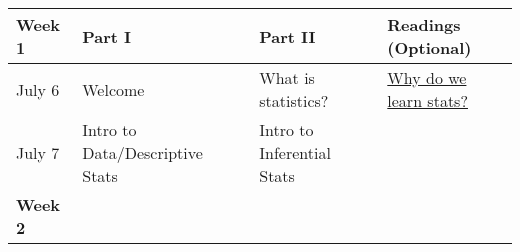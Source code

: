 \documentclass[
]{book}
\begin{document}
\begin{longtable}[]{@{}llll@{}}
\toprule
\begin{minipage}[b]{0.09\columnwidth}\raggedright
\textbf{Week 1}\strut
\end{minipage} & \begin{minipage}[b]{0.32\columnwidth}\raggedright
\textbf{Part I}\strut
\end{minipage} & \begin{minipage}[b]{0.29\columnwidth}\raggedright
\textbf{Part II}\strut
\end{minipage} & \begin{minipage}[b]{0.18\columnwidth}\raggedright
\textbf{Readings (Optional)}\strut
\end{minipage}\tabularnewline
\midrule
\endhead
\begin{minipage}[t]{0.09\columnwidth}\raggedright
July 6\strut
\end{minipage} & \begin{minipage}[t]{0.32\columnwidth}\raggedright
Welcome\strut
\end{minipage} & \begin{minipage}[t]{0.29\columnwidth}\raggedright
What is statistics?\strut
\end{minipage} & \begin{minipage}[t]{0.18\columnwidth}\raggedright
\href{https://learningstatisticswithr.com/book/why-do-we-learn-statistics.html}{Why do we learn stats?}\strut
\end{minipage}\tabularnewline
\begin{minipage}[t]{0.09\columnwidth}\raggedright
July 7\strut
\end{minipage} & \begin{minipage}[t]{0.32\columnwidth}\raggedright
Intro to Data/Descriptive Stats\strut
\end{minipage} & \begin{minipage}[t]{0.29\columnwidth}\raggedright
Intro to Inferential Stats\strut
\end{minipage} & \begin{minipage}[t]{0.18\columnwidth}\raggedright
\strut
\end{minipage}\tabularnewline
\begin{minipage}[t]{0.09\columnwidth}\raggedright
\textbf{Week 2}\strut
\end{minipage} & \begin{minipage}[t]{0.32\columnwidth}\raggedright
\strut
\end{minipage} & \begin{minipage}[t]{0.29\columnwidth}\raggedright

\end{minipage}
\end{longtable}
\end{document}
